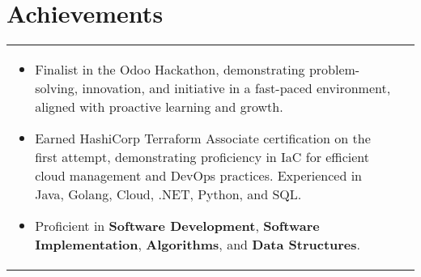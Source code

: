 \documentclass[a4paper,10pt]{article}
\begin{document}
\section{Achievements}
\begin{tabularx}{\linewidth}{ @{}l r@{} }
\begin{minipage}[t]{\linewidth}
\begin{itemize}[nosep,after=\strut, leftmargin=2em, itemsep=2pt]
\item Finalist in the Odoo Hackathon, demonstrating problem-solving, innovation, and initiative in a fast-paced environment, aligned with proactive learning and growth. 
\item Earned HashiCorp Terraform Associate certification on the first attempt, demonstrating proficiency in IaC for efficient cloud management and DevOps practices. Experienced in Java, Golang, Cloud, .NET, Python, and SQL. 
\item Proficient in \textbf{Software Development}, \textbf{Software Implementation}, \textbf{Algorithms}, and \textbf{Data Structures}. 
\end{itemize}
\end{minipage}
\end{tabularx}
\end{document}
